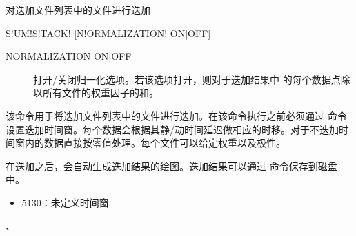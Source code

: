 \label{sss:sumstack}

对迭加文件列表中的文件进行迭加

\begin{SACSTX}
S!UM!S!TACK! [N!ORMALIZATION! ON|OFF]
\end{SACSTX}

\begin{description}
\item [NORMALIZATION ON|OFF] 打开/关闭归一化选项。若该选项打开，则对于迭加结果中
的每个数据点除以所有文件的权重因子的和。
\end{description}

该命令用于将迭加文件列表中的文件进行迭加。在该命令执行之前必须通过  命令设置迭加时间窗。每个数据会根据其静/动时间延迟做相应的时移。对于不迭加时间窗内的数据直接按零值处理。每个文件可以给定权重以及极性。

在迭加之后，会自动生成迭加结果的绘图。迭加结果可以通过  命令保存到磁盘中。

\begin{itemize}
\item 5130：未定义时间窗
\end{itemize}

、
